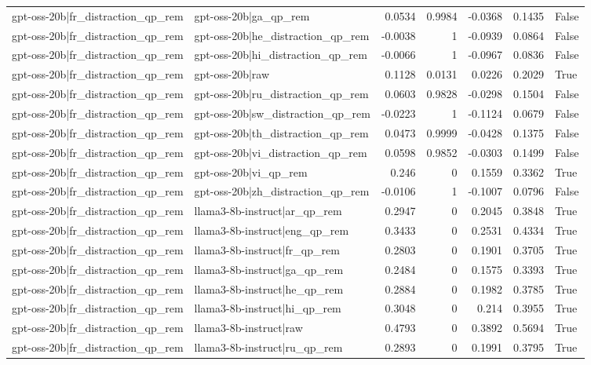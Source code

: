 \begin{table}
\begin{tabular}{l l r r r r l}
gpt-oss-20b|fr_distraction_qp_rem & gpt-oss-20b|ga_qp_rem & 0.0534 & 0.9984 & -0.0368 & 0.1435 & False \\
gpt-oss-20b|fr_distraction_qp_rem & gpt-oss-20b|he_distraction_qp_rem & -0.0038 & 1 & -0.0939 & 0.0864 & False \\
gpt-oss-20b|fr_distraction_qp_rem & gpt-oss-20b|hi_distraction_qp_rem & -0.0066 & 1 & -0.0967 & 0.0836 & False \\
gpt-oss-20b|fr_distraction_qp_rem & gpt-oss-20b|raw & 0.1128 & 0.0131 & 0.0226 & 0.2029 & True \\
gpt-oss-20b|fr_distraction_qp_rem & gpt-oss-20b|ru_distraction_qp_rem & 0.0603 & 0.9828 & -0.0298 & 0.1504 & False \\
gpt-oss-20b|fr_distraction_qp_rem & gpt-oss-20b|sw_distraction_qp_rem & -0.0223 & 1 & -0.1124 & 0.0679 & False \\
gpt-oss-20b|fr_distraction_qp_rem & gpt-oss-20b|th_distraction_qp_rem & 0.0473 & 0.9999 & -0.0428 & 0.1375 & False \\
gpt-oss-20b|fr_distraction_qp_rem & gpt-oss-20b|vi_distraction_qp_rem & 0.0598 & 0.9852 & -0.0303 & 0.1499 & False \\
gpt-oss-20b|fr_distraction_qp_rem & gpt-oss-20b|vi_qp_rem & 0.246 & 0 & 0.1559 & 0.3362 & True \\
gpt-oss-20b|fr_distraction_qp_rem & gpt-oss-20b|zh_distraction_qp_rem & -0.0106 & 1 & -0.1007 & 0.0796 & False \\
gpt-oss-20b|fr_distraction_qp_rem & llama3-8b-instruct|ar_qp_rem & 0.2947 & 0 & 0.2045 & 0.3848 & True \\
gpt-oss-20b|fr_distraction_qp_rem & llama3-8b-instruct|eng_qp_rem & 0.3433 & 0 & 0.2531 & 0.4334 & True \\
gpt-oss-20b|fr_distraction_qp_rem & llama3-8b-instruct|fr_qp_rem & 0.2803 & 0 & 0.1901 & 0.3705 & True \\
gpt-oss-20b|fr_distraction_qp_rem & llama3-8b-instruct|ga_qp_rem & 0.2484 & 0 & 0.1575 & 0.3393 & True \\
gpt-oss-20b|fr_distraction_qp_rem & llama3-8b-instruct|he_qp_rem & 0.2884 & 0 & 0.1982 & 0.3785 & True \\
gpt-oss-20b|fr_distraction_qp_rem & llama3-8b-instruct|hi_qp_rem & 0.3048 & 0 & 0.214 & 0.3955 & True \\
gpt-oss-20b|fr_distraction_qp_rem & llama3-8b-instruct|raw & 0.4793 & 0 & 0.3892 & 0.5694 & True \\
gpt-oss-20b|fr_distraction_qp_rem & llama3-8b-instruct|ru_qp_rem & 0.2893 & 0 & 0.1991 & 0.3795 & True \\

\end{tabular}
\end{table}
